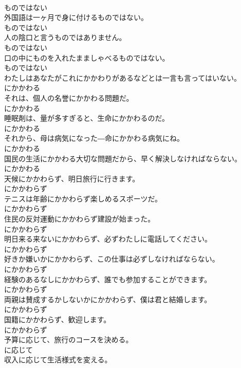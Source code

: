 \documentclass[8pt]{extreport}
\begin{document}
\begin{CJK}{UTF8}{min}
\\	ものではない
\\	外国語は一ヶ月で身に付けるものではない。	
\\	ものではない
\\	人の陰口と言うものではありません。	
\\	ものではない
\\	口の中にものを入れたまましゃべるものではない。	
\\	ものではない
\\	わたしはあなたがこれにかかわりがあるなどとは一言も言ってはいない。	
\\	にかかわる
\\	それは、個人の名誉にかかわる問題だ。	
\\	にかかわる
\\	睡眠剤は、量が多すぎると、生命にかかわるのだ。	
\\	にかかわる
\\	それから、母は病気になった―命にかかわる病気にね。	
\\	にかかわる
\\	国民の生活にかかわる大切な問題だから、早く解決しなければならない。	
\\	にかかわる
\\	天候にかかわらず、明日旅行に行きます。	
\\	にかかわらず
\\	テニスは年齢にかかわらず楽しめるスポーツだ。	
\\	にかかわらず
\\	住民の反対運動にかかわらず建設が始まった。	
\\	にかかわらず
\\	明日来る来ないにかかわらず、必ずわたしに電話してください。	
\\	にかかわらず
\\	好きか嫌いかにかかわらず、この仕事は必ずしなければならない。	
\\	にかかわらず
\\	経験のあるなしにかかわらず、誰でも参加することができます。	
\\	にかかわらず
\\	両親は賛成するかしないかにかかわらず、僕は君と結婚します。	
\\	にかかわらず
\\	国籍にかかわらず、歓迎します。	
\\	にかかわらず
\\	予算に応じて、旅行のコースを決める。	
\\	に応じて
\\	収入に応じて生活様式を変える。	

\end{CJK}
\end{document}
